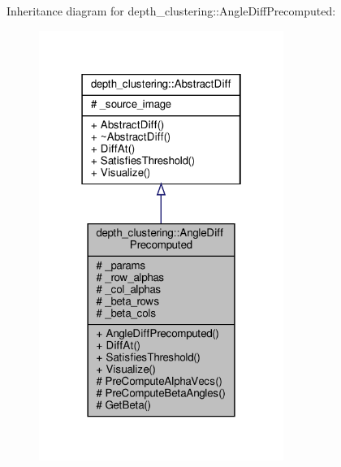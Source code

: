 Inheritance diagram for depth\+\_\+clustering\+:\+:Angle\+Diff\+Precomputed\+:\nopagebreak
\begin{figure}[H]
\begin{center}
\leavevmode
\includegraphics[width=226pt]{classdepth__clustering_1_1AngleDiffPrecomputed__inherit__graph}
\end{center}
\end{figure}


